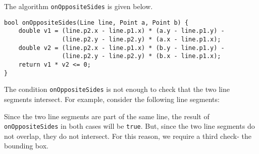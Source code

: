 \documentclass[a4paper, openany]{memoir}
\begin{document}
The algorithm \texttt{onOppositeSides} is given below.
\begin{lstlisting}[language=pseudocode]
bool onOppositeSides(Line line, Point a, Point b) {
    double v1 = (line.p2.x - line.p1.x) * (a.y - line.p1.y) - 
                (line.p2.y - line.p2.y) * (a.x - line.p1.x);
    double v2 = (line.p2.x - line.p1.x) * (b.y - line.p1.y) - 
                (line.p2.y - line.p2.y) * (b.x - line.p1.x);
    return v1 * v2 <= 0;
}
\end{lstlisting}


The condition \texttt{onOppositeSides} is not enough to check that the two line segments intersect. For example, consider the following line segments:
\begin{figure}[H]
    \centering
\end{figure}
\noindent Since the two line segments are part of the same line, the result of \texttt{onOppositeSides} in both cases will be \texttt{true}. But, since the two line segments do not overlap, they do not intersect. For this reason, we require a third check- the bounding box.
\end{document}
